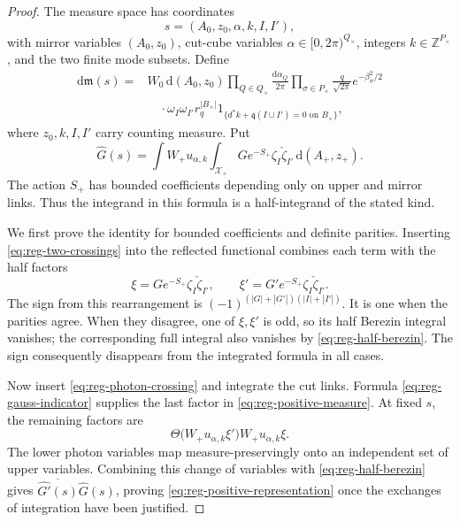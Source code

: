 \documentclass[11pt,letterpaper,reqno]{amsart}
\newcommand{\Z}{\mathbb Z}
\newcommand{\dd}{\mathrm d}
\begin{document}
\begin{proof}
The measure space has coordinates
\[
 s=(A_0,z_0,\alpha,k,I,I'),
\]
with mirror variables $(A_0,z_0)$, cut-cube variables
$\alpha\in[0,2\pi)^{Q_\times}$, integers $k\in\Z^{P_\times}$, and
the two finite mode subsets. Define
\begin{align}\label{eq:reg-positive-measure}
 \dd\mathfrak m(s)={}&W_0\,\dd(A_0,z_0)
     \prod_{Q\in Q_\times}\frac{\dd\alpha_Q}{2\pi}
     \prod_{\sigma\in P_\times}
                         \frac{q}{\sqrt{2\pi}}e^{-\beta_\sigma^2/2}
 \nonumber\\
 &\quad\cdot\omega_I\omega_{I'}r_q^{|B_\times|}
        1_{\{d^*k+\mathfrak q(I\cup I')=0\text{ on }B_\times\}},
\end{align}
where $z_0,k,I,I'$ carry counting measure. Put
\begin{equation}\label{eq:reg-half-transform}
 \widehat G(s)=\int W_+u_{\alpha,k}
         \int_{\mathcal X_+}G e^{-S_+}\zeta_I\check\zeta_{I'}
                                      \,\dd(A_+,z_+).
\end{equation}
The action $S_+$ has bounded coefficients depending only on upper
and mirror links. Thus the integrand in this formula is a
half-integrand of the stated kind.

We first prove the identity for bounded coefficients and definite
parities. Inserting \eqref{eq:reg-two-crossings} into the reflected
functional combines each term with the half factors
\[
 \xi=G e^{-S_+}\zeta_I\check\zeta_{I'},\qquad
 \xi'=G'e^{-S_+}\zeta_I\check\zeta_{I'}.
\]
The sign from this rearrangement is
$(-1)^{(|G|+|G'|)(|I|+|I'|)}$. It is one when the parities agree.
When they disagree, one of $\xi,\xi'$ is odd, so its half Berezin
integral vanishes; the corresponding full integral also vanishes
by \eqref{eq:reg-half-berezin}. The sign consequently disappears
from the integrated formula in all cases.

Now insert \eqref{eq:reg-photon-crossing} and integrate the cut
links. Formula \eqref{eq:reg-gauss-indicator} supplies the last
factor in \eqref{eq:reg-positive-measure}. At fixed $s$, the
remaining factors are
\[
 \Theta\bigl(W_+u_{\alpha,k}\xi'\bigr)
                    W_+u_{\alpha,k}\xi.
\]
The lower photon variables map measure-preservingly onto an
independent set of upper variables. Combining this change of
variables with \eqref{eq:reg-half-berezin} gives
$\overline{\widehat{G'}(s)}\widehat G(s)$, proving
\eqref{eq:reg-positive-representation} once the exchanges of
integration have been justified.


\end{proof}
\end{document}
